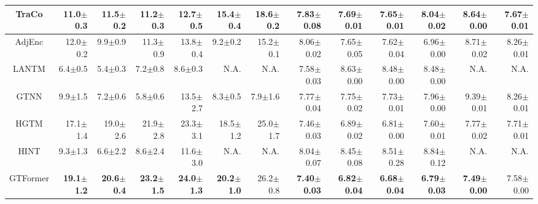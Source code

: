 \begin{table*}[!h]
{\begin{tabular}{c|rrrrrr|rrrrrr}
            TraCo & 11.0$ \pm $0.3 & 11.5$ \pm $0.2 & 11.2$ \pm $0.3 & 12.7$ \pm $0.5 & 15.4$ \pm $0.4 & 18.6$ \pm $0.2 & 7.83$ \pm $0.08 & 7.69$ \pm $0.01 & 7.65$ \pm $0.01 & 8.04$ \pm $0.02 & 8.64$ \pm $0.00 & 7.67$ \pm $0.01 \\
			\hline
			AdjEnc & 12.0$ \pm $0.2 & 9.9$ \pm $0.9 & 11.3$ \pm $0.9 & 13.8$ \pm $0.4 & 9.2$ \pm $0.2 & 15.2$ \pm $0.1 & 8.06$ \pm $0.02 & 7.65$ \pm $0.05 & 7.62$ \pm $0.04 & 6.96$ \pm $0.00 & 8.71$ \pm $0.02 & 8.26$ \pm $0.01 \\
			LANTM & 6.4$ \pm $0.5 & 5.4$ \pm $0.3 & 7.2$ \pm $0.8 & 8.6$ \pm $0.3 & N.A. & N.A. & 7.58$ \pm $0.03 & 8.63$ \pm $0.00 & 8.48$ \pm $0.00 & 8.48$ \pm $0.00 & N.A. & N.A. \\
			GTNN & 9.9$ \pm $1.5 & 7.2$ \pm $0.6 & 5.8$ \pm $0.6 & 13.5$ \pm $2.7 & 8.3$ \pm $0.5 & 7.9$ \pm $1.6 & 7.77$ \pm $0.04 & 7.75$ \pm $0.02 & 7.73$ \pm $0.01 & 7.96$ \pm $0.00 & 9.39$ \pm $0.01 & 8.26$ \pm $0.01 \\
            HGTM & 17.1$ \pm $1.4 & 19.0$ \pm $2.6 & 21.9$ \pm $2.8 & 23.3$ \pm $3.1 & 18.5$ \pm $1.2 & 25.0$ \pm $1.7 & 7.46$ \pm $0.03 & 6.89$ \pm $0.02 & 6.81$ \pm $0.00 & 7.60$ \pm $0.01 & 7.77$ \pm $0.02 & 7.71$ \pm $0.01 \\
			\hline
			HINT & 9.3$ \pm $1.3 & 6.6$ \pm $2.2 & 8.6$ \pm $2.4 & 11.6$ \pm $3.0 & N.A. & N.A. & 8.04$ \pm $0.07 & 8.45$ \pm $0.08 & 8.51$ \pm $0.28 & 8.84$ \pm $0.12 & N.A. & N.A. \\
			\hline
			GTFormer & \textbf{19.1}$ \pm $\textbf{1.2} & \textbf{20.6}$ \pm $\textbf{0.4} & \textbf{23.2}$ \pm $\textbf{1.5} & \textbf{24.0}$ \pm $\textbf{1.3} & \textbf{20.2}$ \pm $\textbf{1.0} & 26.2$ \pm $0.8 & \textbf{7.40}$ \pm $\textbf{0.03} & \textbf{6.82}$ \pm $\textbf{0.04} & \textbf{6.68}$ \pm $\textbf{0.04} & \textbf{6.79}$ \pm $\textbf{0.03} & \textbf{7.49}$ \pm $\textbf{0.00} & 7.58$ \pm $0.00 \\
			\bottomrule
		\end{tabular}
	}
	\vspace{-0.4cm}
	\label{table:topic_analysis}
\end{table*}

